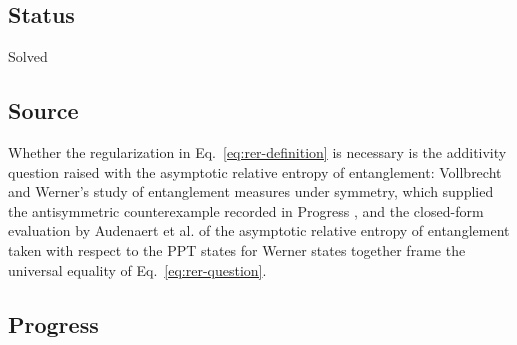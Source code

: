 \subsection*{Status}

Solved

\subsection*{Source}

Whether the regularization in Eq.~\eqref{eq:rer-definition} is necessary is
the additivity question raised with the asymptotic relative entropy of
entanglement: Vollbrecht and Werner's study of entanglement measures under
symmetry, which supplied the antisymmetric counterexample recorded in
Progress , and the closed-form
evaluation by Audenaert et al. of the asymptotic relative entropy of
entanglement taken with respect to the PPT states for Werner states
 together frame the universal equality
of Eq.~\eqref{eq:rer-question}.

\subsection*{Progress}

